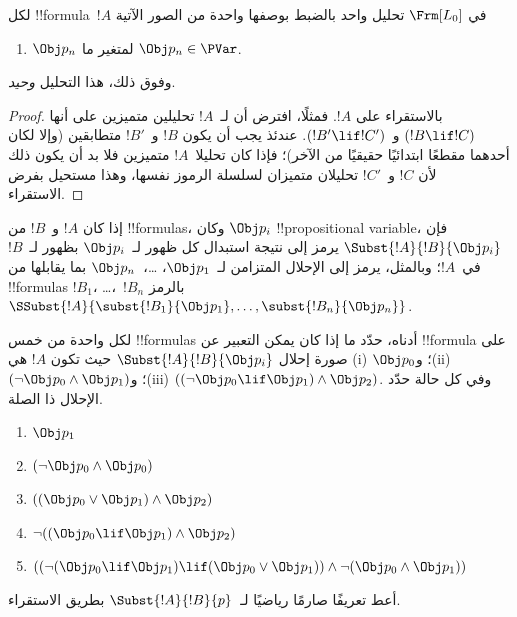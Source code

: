 \documentclass[../../../include/open-logic-section]{subfiles}
\begin{document}
\begin{prop}
لكل !!{formula}~$!A$ في $ \Frm[L_0]$ تحليل واحد بالضبط بوصفها واحدة من
الصور الآتية
\begin{enumerate}


\item $\Obj p_n$ لمتغير ما $\Obj p_n \in  \PVar$.





\end{enumerate}
وفوق ذلك، هذا التحليل \emph{وحيد}.
\end{prop}

\begin{proof}
بالاستقراء على $!A$. فمثلًا، افترض أن لـ~$!A$ تحليلين متميزين على
أنها $(!B \lif !C)$ و~$(!B' \lif !C')$. عندئذ يجب أن يكون $!B$ و~$!B'$
متطابقين (وإلا لكان أحدهما مقطعًا ابتدائيًا حقيقيًا من الآخر)؛ فإذا كان
تحليلا~$!A$ متميزين فلا بد أن يكون ذلك لأن $!C$ و~$!C'$ تحليلان
متميزان لسلسلة الرموز نفسها، وهذا مستحيل بفرض الاستقراء.
\end{proof}


\begin{defn}
إذا كان $!A$ و~$!B$ من !!{formula}s، وكان $\Obj p_i$ !!{propositional
variable}، فإن $\Subst{!A}{!B}{\Obj p_i}$ يرمز إلى نتيجة
استبدال كل ظهور لـ~$\Obj p_i$ بظهور لـ~$!B$ في~$!A$؛
وبالمثل، يرمز إلى الإحلال المتزامن لـ~$\Obj p_1$، \dots،~$\Obj p_n$ بما
يقابلها من !!{formula}s $!B_1$، \dots،~$!B_n$ بالرمز
$\SSubst{!A}{\subst{!B_1}{\Obj p_1},\dots,\subst{!B_n}{\Obj p_n}}$.
\end{defn}

\begin{prob} لكل واحدة من خمس !!{formula}s أدناه، حدّد ما إذا كان يمكن
 التعبير عن !!{formula} على صورة إحلال \( \Subst{!A}{!B}{\Obj p_i} \)
 حيث تكون \( !A \) هي (i) \( \Obj p_0 \)؛ و(ii) \( ( \lnot \Obj p_0 \land \Obj
 p_1) \)؛ و(iii) \( ( ( \lnot \Obj p_0 \lif \Obj p_1 ) \land \Obj
 p_2 ) \). وفي كل حالة حدّد الإحلال ذا الصلة.
  \begin{enumerate}
    \item \( \Obj p_1 \)
    \item \( ( \lnot \Obj p_0 \land \Obj p_0 ) \)
    \item \( ( ( \Obj p_0 \lor \Obj p_1 ) \land \Obj p_2 )  \)
    \item \( \lnot ( ( \Obj p_0 \lif \Obj p_1 ) \land \Obj p_2 ) \)
    \item \( (( \lnot ( \Obj p_0 \lif \Obj p_1 ) \lif ( \Obj p_0 \lor \Obj p_1 )) \land \lnot ( \Obj p_0 \land \Obj p_1 )) \)
  \end{enumerate}
\end{prob}

\begin{prob}
أعط تعريفًا صارمًا رياضيًا لـ~$\Subst{!A}{!B}{p}$ بطريق
الاستقراء.
\end{prob}
\end{document}
